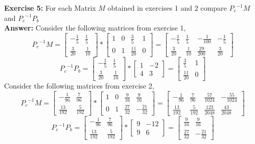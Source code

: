 \documentclass{amsart}
\begin{document}
\noindent\textbf{Exercise 5: } For each Matrix $M$ obtained in exercises 1 and 2 compare ${P_c}^{-1}M$ and ${P_c}^{-1}P_b$\\
\noindent \textbf{Answer: }Consider the following matrices from exercise 1,
\begin{equation*}
{P_c}^{-1}M=\begin{bmatrix}-\frac{1}{5}&\frac{1}{5}\\ \frac{3}{20}&\frac{1}{10}\end{bmatrix}*\begin{bmatrix}1&0&\frac{3}{5}&1\\ 0&1&\frac{11}{20}&0\end{bmatrix}
=\begin{bmatrix}-\frac{1}{5}&\frac{1}{5}&-\frac{1}{100}&-\frac{1}{5}\\ \frac{3}{20}&\frac{1}{10}&\frac{29}{200}&\frac{3}{20}\end{bmatrix}
\end{equation*}
\begin{equation*}
{P_c}^{-1}P_b =\begin{bmatrix}-\frac{1}{5}&\frac{1}{5}\\ \frac{3}{20}&\frac{1}{10}\end{bmatrix}*\begin{bmatrix}
1&-2\\
4&3
\end{bmatrix}
=\begin{bmatrix}\frac{3}{5}&1\\ \frac{11}{20}&0\end{bmatrix}
\end{equation*}
Consider the following matrices from exercise 2,
\begin{equation*}
{P_c}^{-1}M=\begin{bmatrix}-\frac{1}{96}&\frac{7}{96}\\ \frac{13}{192}&\frac{5}{192}\end{bmatrix}*\begin{bmatrix}1&0&\frac{9}{16}&\frac{9}{16}\\ 0&1&\frac{27}{32}&-\frac{21}{32}\end{bmatrix}
= \begin{bmatrix}-\frac{1}{96}&\frac{7}{96}&\frac{57}{1024}&-\frac{55}{1024}\\ \frac{13}{192}&\frac{5}{192}&\frac{123}{2048}&\frac{43}{2048}\end{bmatrix}


\end{equation*}
\begin{equation*}
{P_c}^{-1}P_b =\begin{bmatrix}-\frac{1}{96}&\frac{7}{96}\\ \frac{13}{192}&\frac{5}{192}\end{bmatrix}*\begin{bmatrix}
9&-12\\
9&6
\end{bmatrix}
=\begin{bmatrix}\frac{9}{16}&\frac{9}{16}\\ \frac{27}{32}&-\frac{21}{32}\end{bmatrix}
\end{equation*}
\end{document}
